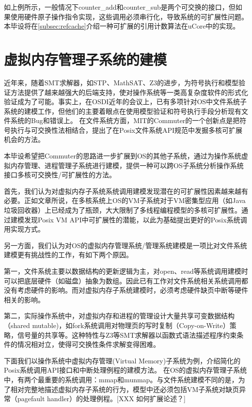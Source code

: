 如上例所示，一般情况下counter\_add和counter\_sub是两个可交换的接口，但如果使用硬件原子操作指令实现，这些调用必须串行化，导致系统的可扩展性问题。本毕设将在\ref{subsec:refcache}介绍一种可扩展的引用计数算法在uCore中的实现。

\section{虚拟内存管理子系统的建模}

近年来，随着SMT求解器，如STP、MathSAT、Z3\cite{DeMoura:2008:ZES:1792734.1792766}的进步，为符号执行和模型验证方法提供了越来越强大的后端支持，使对操作系统等一类高复杂度软件的形式化验证成为了可能。事实上，在OSDI近年的会议上，已有多项针对OS中文件系统子系统的建模工作\cite{radixvm:eurosys13}\cite{Yang:2006:UMC:1189256.1189259}，但他们的主要着眼点在使用模型验证和符号执行手段分析现有文件系统的Bug和错误上。
在文件系统方面，MIT的Commuter\cite{commuter:2013}的一个创新点是把符号执行与可交换性法相结合，提出了在Posix文件系统API规范中发掘多核可扩展机会的方法。

本毕设希望把Commuter的思路进一步扩展到OS的其他子系统，通过为操作系统虚拟内存管理、进程管理子系统进行建模，提供一种可以跨OS子系统分析操作系统接口多核可交换性/可扩展性的方法。

首先，我们认为对虚拟内存子系统系统调用建模发现潜在的可扩展性因素越来越有必要。正如文章\cite{radixvm:eurosys13}所说，在多核系统上OS的VM子系统对于VM密集型应用（如Java垃圾回收器）上已经成为了瓶颈，大大限制了多线程编程模型的多核可扩展性。通过建模发现Posix
VM API中可扩展性的潜能，以此为基础提出更好的Posix系统调用实现方式。

另一方面，我们认为对OS的虚拟内存管理系统/管理系统建模是一项比对文件系统建模更有挑战性的工作，有如下两个原因。

第一，文件系统主要以数据结构的更新逻辑为主，对open、read等系统调用建模时可以把底层硬件（如磁盘）抽象为数组。因此已有工作对文件系统相关系统调用都没有考虑硬件的影响。而对虚拟内存子系统建模时，必须考虑硬件缺页中断等硬件相关的影响。

第二，实际操作系统中，对虚拟内存和进程的管理设计大量共享可变数据结构（shared
mutable)，如fork系统调用对物理页的写时复制（Copy-on-Write）策略，信号量的共享等。这种特性与Z3等SMT求解器以函数式语法描述程序约束条件的情况相对立，使得可交换性条件求解变得困难。

下面我们以操作系统中虚拟内存管理(Virtual Memory)子系统为例，介绍简化的Posix系统调用API接口和中断处理例程的建模方法。
在OS的虚拟内存管理子系统中，有两个最重要的系统调用：mmap和munmap。与文件系统建模不同的是，为了相对完整地描述虚拟内存子系统的行为，模型中还必须包括VM子系统对缺页异常（pagefault
handler）的处理例程。[XXX 如何扩展论述？]

